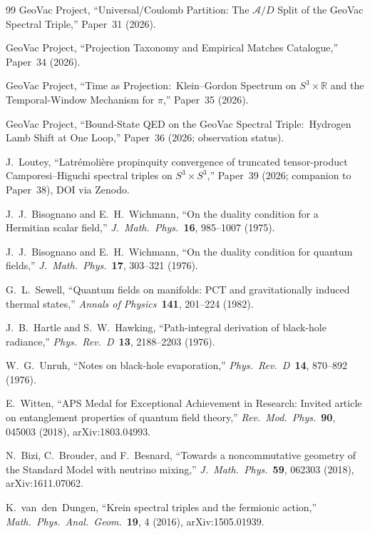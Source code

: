 \documentclass[11pt]{article}
\begin{document}
\begin{thebibliography}{99}
GeoVac Project, ``Universal/Coulomb Partition: The $\mathcal{A}/D$
Split of the GeoVac Spectral Triple,'' Paper~31 (2026).

GeoVac Project, ``Projection Taxonomy and Empirical Matches
Catalogue,'' Paper~34 (2026).

GeoVac Project, ``Time as Projection:\ Klein--Gordon Spectrum on
$S^3 \times \mathbb{R}$ and the Temporal-Window Mechanism for $\pi$,''
Paper~35 (2026).

GeoVac Project, ``Bound-State QED on the GeoVac Spectral Triple:\
Hydrogen Lamb Shift at One Loop,'' Paper~36 (2026; observation status).

J.~Loutey, ``Latr\'emoli\`ere propinquity convergence of truncated
tensor-product Camporesi--Higuchi spectral triples on $S^3 \times S^3$,''
Paper~39 (2026; companion to Paper~38), DOI via Zenodo.

J.~J.~Bisognano and E.~H.~Wichmann,
``On the duality condition for a Hermitian scalar field,''
\textit{J.~Math.~Phys.}\ \textbf{16}, 985--1007 (1975).

J.~J.~Bisognano and E.~H.~Wichmann,
``On the duality condition for quantum fields,''
\textit{J.~Math.~Phys.}\ \textbf{17}, 303--321 (1976).

G.~L.~Sewell,
``Quantum fields on manifolds: PCT and gravitationally induced thermal
states,''
\textit{Annals of Physics}\ \textbf{141}, 201--224 (1982).

J.~B.~Hartle and S.~W.~Hawking,
``Path-integral derivation of black-hole radiance,''
\textit{Phys.~Rev.~D}\ \textbf{13}, 2188--2203 (1976).

W.~G.~Unruh,
``Notes on black-hole evaporation,''
\textit{Phys.~Rev.~D}\ \textbf{14}, 870--892 (1976).

E.~Witten,
``APS Medal for Exceptional Achievement in Research: Invited article on
entanglement properties of quantum field theory,''
\textit{Rev.~Mod.~Phys.}\ \textbf{90}, 045003 (2018), arXiv:1803.04993.

N.~Bizi, C.~Brouder, and F.~Besnard,
``Towards a noncommutative geometry of the Standard Model with neutrino
mixing,''
\textit{J.~Math.~Phys.}\ \textbf{59}, 062303 (2018), arXiv:1611.07062.

K.~van~den~Dungen,
``Krein spectral triples and the fermionic action,''
\textit{Math.\ Phys.\ Anal.\ Geom.}\ \textbf{19}, 4 (2016),
arXiv:1505.01939.


\end{thebibliography}
\end{document}
